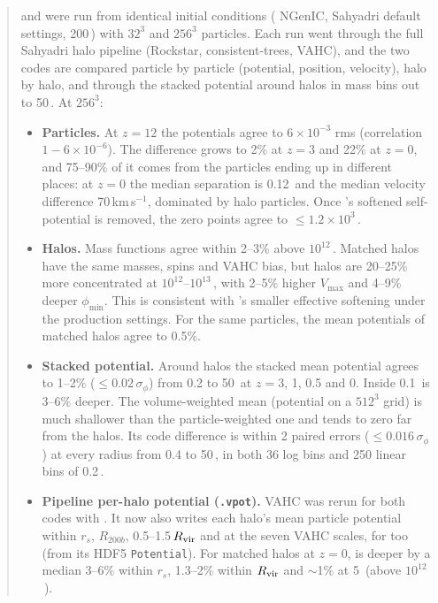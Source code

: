 \begin{abstract}
\noindent \gad{} and \pkd{} were run from identical initial conditions (\gad{} NGenIC, Sahyadri default settings,
200\,\Mpch) with $32^3$ and $256^3$ particles. Each run went through the full Sahyadri halo pipeline (Rockstar,
consistent-trees, VAHC), and the two codes are compared particle by particle (potential, position, velocity), halo by
halo, and through the stacked potential around halos in mass bins out to 50\,\Mpch. At $256^3$:
\begin{itemize}
\item \textbf{Particles.} At $z=12$ the potentials agree to $6\times10^{-3}$ rms (correlation $1-6\times10^{-6}$). The
difference grows to 2\% at $z=3$ and 22\% at $z=0$, and 75--90\% of it comes from the particles ending up in
different places: at $z=0$ the median separation is 0.12\,\Mpch{} and the median velocity difference 70\,km\,s$^{-1}$,
dominated by halo particles. Once \pkd{}'s softened self-potential is removed, the zero points agree to
$\le1.2\times10^3$\,\kms.
\item \textbf{Halos.} Mass functions agree within 2--3\% above $10^{12}$\,\Msunh. Matched halos have the same masses,
spins and VAHC bias, but \pkd{} halos are 20--25\% more concentrated at $10^{12}$--$10^{13}$\,\Msunh, with 2--5\%
higher $V_{\max}$ and 4--9\% deeper $\phi_{\min}$. This is consistent with \pkd{}'s smaller effective softening
under the production settings. For the same particles, the mean potentials of matched halos agree to 0.5\%.
\item \textbf{Stacked potential.} Around halos the stacked mean potential agrees to 1--2\% ($\le0.02\,\sigma_\phi$)
from 0.2 to 50\,\Mpch{} at $z = 3$, 1, 0.5 and 0. Inside 0.1\,\Mpch{} \pkd{} is 3--6\% deeper.
The volume-weighted mean (potential on a $512^3$ grid) is much shallower than the particle-weighted one and tends to
zero far from the halos. Its code difference is within 2 paired errors ($\le0.016\,\sigma_\phi$) at every radius
from 0.4 to 50\,\Mpch, in both 36 log bins and 250 linear bins of 0.2\,\Mpch.
\item \textbf{Pipeline per-halo potential (\texttt{.vpot}).} VAHC was rerun for both codes with . It
now also writes each halo's mean particle potential within $r_s$, $R_{200b}$, 0.5--1.5\,$R_{\rm vir}$ and at the seven
VAHC scales, for \gad{} too (from its HDF5 \texttt{Potential}). For matched halos at $z=0$, \pkd{} is deeper by a
median 3--6\% within $r_s$, 1.3--2\% within $R_{\rm vir}$ and $\sim$1\% at 5\,\Mpch{} (above $10^{12}$\,\Msunh).

\end{itemize}
\end{abstract}
